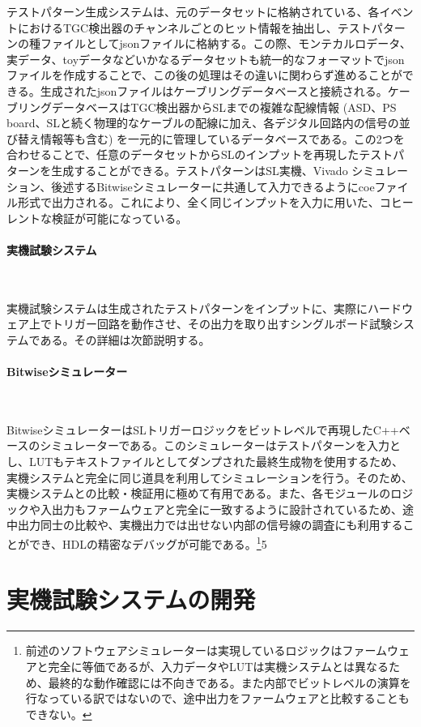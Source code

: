 テストパターン生成システムは、元のデータセットに格納されている、各イベントにおけるTGC検出器のチャンネルごとのヒット情報を抽出し、テストパターンの種ファイルとしてjsonファイルに格納する。この際、モンテカルロデータ、実データ、toyデータなどいかなるデータセットも統一的なフォーマットでjsonファイルを作成することで、この後の処理はその違いに関わらず進めることができる。生成されたjsonファイルはケーブリングデータベースと接続される。ケーブリングデータベースはTGC検出器からSLまでの複雑な配線情報 (ASD、PS board、SLと続く物理的なケーブルの配線に加え、各デジタル回路内の信号の並び替え情報等も含む) を一元的に管理しているデータベースである。この2つを合わせることで、任意のデータセットからSLのインプットを再現したテストパターンを生成することができる。テストパターンはSL実機、Vivado シミュレーション、後述するBitwiseシミュレーターに共通して入力できるようにcoeファイル形式で出力される。これにより、全く同じインプットを入力に用いた、コヒーレントな検証が可能になっている。

\paragraph{実機試験システム}　　
\par
実機試験システムは生成されたテストパターンをインプットに、実際にハードウェア上でトリガー回路を動作させ、その出力を取り出すシングルボード試験システムである。その詳細は次節説明する。

\paragraph{Bitwiseシミュレーター}　　
\par
BitwiseシミュレーターはSLトリガーロジックをビットレベルで再現したC++ベースのシミュレーターである。このシミュレーターはテストパターンを入力とし、LUTもテキストファイルとしてダンプされた最終生成物を使用するため、実機システムと完全に同じ道具を利用してシミュレーションを行う。そのため、実機システムとの比較・検証用に極めて有用である。また、各モジュールのロジックや入出力もファームウェアと完全に一致するように設計されているため、途中出力同士の比較や、実機出力では出せない内部の信号線の調査にも利用することができ、HDLの精密なデバッグが可能である。\footnote{前述のソフトウェアシミュレーターは実現しているロジックはファームウェアと完全に等価であるが、入力データやLUTは実機システムとは異なるため、最終的な動作確認には不向きである。また内部でビットレベルの演算を行なっている訳ではないので、途中出力をファームウェアと比較することもできない。}5

\section{実機試験システムの開発}
